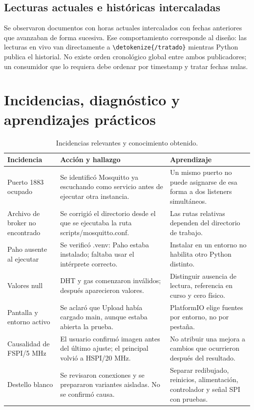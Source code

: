 \documentclass[11pt,a4paper]{article}
\newcommand{\code}[1]{\expandafter\nolinkurl\expandafter{\detokenize{#1}}}
\newcommand{\nextsection}[1]{\clearpage\section{#1}}
\begin{document}
\subsection{Lecturas actuales e históricas intercaladas}
Se observaron documentos con horas actuales intercalados con fechas anteriores que avanzaban de forma sucesiva. Ese comportamiento corresponde al diseño: las lecturas en vivo van directamente a \code{/tratado} mientras Python publica el historial. No existe orden cronológico global entre ambos publicadores; un consumidor que lo requiera debe ordenar por timestamp y tratar fechas nulas.

\nextsection{Incidencias, diagnóstico y aprendizajes prácticos}
\begin{table}[h!]
\small
\begin{tabularx}{\linewidth}{@{}P{38mm}YY@{}}
\toprule
\textbf{Incidencia} & \textbf{Acción y hallazgo} & \textbf{Aprendizaje}\\\midrule
Puerto 1883 ocupado & Se identificó Mosquitto ya escuchando como servicio antes de ejecutar otra instancia. & Un mismo puerto no puede asignarse de esa forma a dos listeners simultáneos.\\
Archivo de broker no encontrado & Se corrigió el directorio desde el que se ejecutaba la ruta scripts/mosquitto.conf. & Las rutas relativas dependen del directorio de trabajo.\\
Paho ausente al ejecutar & Se verificó .venv: Paho estaba instalado; faltaba usar el intérprete correcto. & Instalar en un entorno no habilita otro Python distinto.\\
Valores null & DHT y gas comenzaron inválidos; después aparecieron valores. & Distinguir ausencia de lectura, referencia en curso y cero físico.\\
Pantalla y entorno activo & Se aclaró que Upload había cargado main, aunque estaba abierta la prueba. & PlatformIO elige fuentes por entorno, no por pestaña.\\
Causalidad de FSPI/5 MHz & El usuario confirmó imagen antes del último ajuste; el principal volvió a HSPI/20 MHz. & No atribuir una mejora a cambios que ocurrieron después del resultado.\\
Destello blanco & Se revisaron conexiones y se prepararon variantes aisladas. No se confirmó causa. & Separar redibujado, reinicios, alimentación, controlador y señal SPI con pruebas.\\
\bottomrule
\end{tabularx}
\caption{Incidencias relevantes y conocimiento obtenido.}
\end{table}
\end{document}

